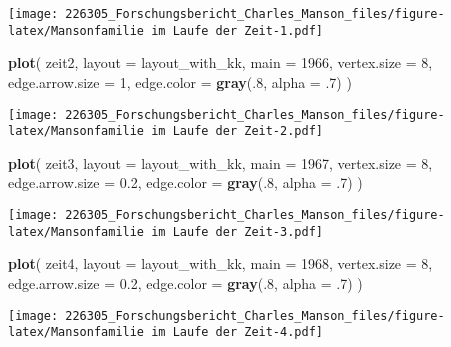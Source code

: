 \documentclass[
]{article}
\newenvironment{Shaded}{\begin{snugshade}}{\end{snugshade}}
\newcommand{\DataTypeTok}[1]{\textcolor[rgb]{0.13,0.29,0.53}{#1}}
\newcommand{\DecValTok}[1]{\textcolor[rgb]{0.00,0.00,0.81}{#1}}
\newcommand{\FloatTok}[1]{\textcolor[rgb]{0.00,0.00,0.81}{#1}}
\newcommand{\KeywordTok}[1]{\textcolor[rgb]{0.13,0.29,0.53}{\textbf{#1}}}
\newcommand{\NormalTok}[1]{#1}
\begin{document}
\texttt{[image: 226305\_Forschungsbericht\_Charles\_Manson\_files/figure-latex/Mansonfamilie im Laufe der Zeit-1.pdf]}

\begin{Shaded}
\begin{Highlighting}[]
\KeywordTok{plot}\NormalTok{(}
\NormalTok{  zeit2,}
  \DataTypeTok{layout =}\NormalTok{ layout_with_kk,}
  \DataTypeTok{main =} \DecValTok{1966}\NormalTok{,}
  \DataTypeTok{vertex.size =} \DecValTok{8}\NormalTok{,}
  \DataTypeTok{edge.arrow.size =} \DecValTok{1}\NormalTok{,}
  \DataTypeTok{edge.color =} \KeywordTok{gray}\NormalTok{(.}\DecValTok{8}\NormalTok{, }\DataTypeTok{alpha =} \FloatTok{.7}\NormalTok{)}
\NormalTok{)}
\end{Highlighting}
\end{Shaded}

\texttt{[image: 226305\_Forschungsbericht\_Charles\_Manson\_files/figure-latex/Mansonfamilie im Laufe der Zeit-2.pdf]}

\begin{Shaded}
\begin{Highlighting}[]
\KeywordTok{plot}\NormalTok{(}
\NormalTok{  zeit3,}
  \DataTypeTok{layout =}\NormalTok{ layout_with_kk,}
  \DataTypeTok{main =} \DecValTok{1967}\NormalTok{,}
  \DataTypeTok{vertex.size =} \DecValTok{8}\NormalTok{,}
  \DataTypeTok{edge.arrow.size =} \FloatTok{0.2}\NormalTok{,}
  \DataTypeTok{edge.color =} \KeywordTok{gray}\NormalTok{(.}\DecValTok{8}\NormalTok{, }\DataTypeTok{alpha =} \FloatTok{.7}\NormalTok{)}
\NormalTok{)}
\end{Highlighting}
\end{Shaded}

\texttt{[image: 226305\_Forschungsbericht\_Charles\_Manson\_files/figure-latex/Mansonfamilie im Laufe der Zeit-3.pdf]}

\begin{Shaded}
\begin{Highlighting}[]
\KeywordTok{plot}\NormalTok{(}
\NormalTok{  zeit4,}
  \DataTypeTok{layout =}\NormalTok{ layout_with_kk,}
  \DataTypeTok{main =} \DecValTok{1968}\NormalTok{,}
  \DataTypeTok{vertex.size =} \DecValTok{8}\NormalTok{,}
  \DataTypeTok{edge.arrow.size =} \FloatTok{0.2}\NormalTok{,}
  \DataTypeTok{edge.color =} \KeywordTok{gray}\NormalTok{(.}\DecValTok{8}\NormalTok{, }\DataTypeTok{alpha =} \FloatTok{.7}\NormalTok{)}
\NormalTok{)}
\end{Highlighting}
\end{Shaded}

\texttt{[image: 226305\_Forschungsbericht\_Charles\_Manson\_files/figure-latex/Mansonfamilie im Laufe der Zeit-4.pdf]}
\end{document}
